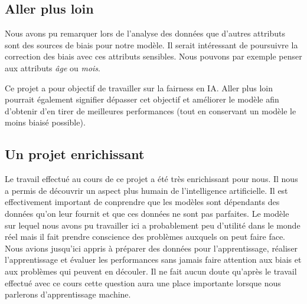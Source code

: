 \documentclass{article}
\begin{document}
    \subsection{Aller plus loin}
    Nous avons pu remarquer lors de l'analyse des données que d'autres attributs sont des sources de biais pour 
    notre modèle. Il serait intéressant de poursuivre la correction des biais avec ces attributs 
    sensibles. Nous pouvons par exemple penser aux attributs \textit{âge} ou \textit{mois}. 
    
    Ce projet a pour objectif de travailler sur la fairness en IA. Aller plus loin pourrait également 
    signifier dépasser cet objectif et améliorer le modèle afin d'obtenir d'en tirer de meilleures 
    performances (tout en conservant un modèle le moins biaisé possible).

    \subsection{Un projet enrichissant}
    Le travail effectué au cours de ce projet a été très enrichissant pour nous. Il nous a permis de 
    découvrir un aspect plus humain de l'intelligence artificielle. Il est effectivement important de 
    conprendre que les modèles sont dépendants des données qu'on leur fournit et que ces données ne 
    sont pas parfaites. Le modèle sur lequel nous avons pu travailler ici a probablement peu d'utilité 
    dans le monde réel mais il fait prendre conscience des problèmes auxquels on peut faire face.
    Nous avions jusqu'ici appris à préparer des données pour l'apprentissage, réaliser l'apprentissage et
    évaluer les performances sans jamais faire attention aux biais et aux problèmes qui peuvent en découler.
    Il ne fait aucun doute qu'après le travail effectué avec ce cours cette question aura une place 
    importante lorsque nous parlerons d'apprentissage machine.


    \newpage
    \appendix
\end{document}

